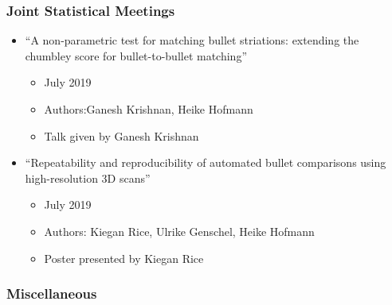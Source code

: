 \documentclass[]{book}
\providecommand{\tightlist}{%
  \setlength{\itemsep}{0pt}\setlength{\parskip}{0pt}}
\begin{document}
\hypertarget{joint-statistical-meetings}{%
\subsubsection{Joint Statistical Meetings}\label{joint-statistical-meetings}}

\begin{itemize}
\tightlist
\item
  ``A non-parametric test for matching bullet striations: extending the chumbley score for bullet-to-bullet matching''

  \begin{itemize}
  \tightlist
  \item
    July 2019
  \item
    Authors:Ganesh Krishnan, Heike Hofmann
  \item
    Talk given by Ganesh Krishnan
  \end{itemize}
\item
  ``Repeatability and reproducibility of automated bullet comparisons using high-resolution 3D scans''

  \begin{itemize}
  \tightlist
  \item
    July 2019
  \item
    Authors: Kiegan Rice, Ulrike Genschel, Heike Hofmann
  \item
    Poster presented by Kiegan Rice
  \end{itemize}
\end{itemize}

\hypertarget{miscellaneous}{%
\subsubsection{Miscellaneous}\label{miscellaneous}}
\end{document}
